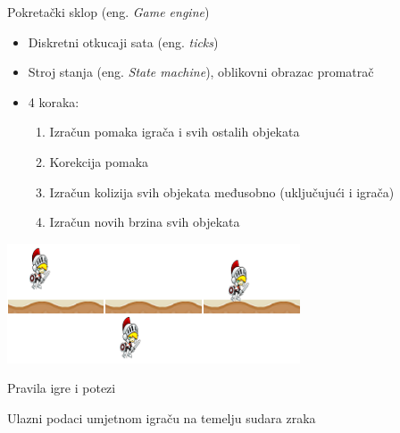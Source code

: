   \begin{frame}{Pokretački sklop (eng. \textit{Game engine})}
  	\begin{itemize}
  		\item Diskretni otkucaji sata (eng. \textit{ticks})
  		\item Stroj stanja (eng. \textit{State machine}), oblikovni obrazac promatrač
  		\item 4 koraka:
  		\begin{enumerate}
  			\item Izračun pomaka igrača i svih ostalih objekata
  			\item Korekcija pomaka
  			\item Izračun kolizija svih objekata međusobno (uključujući i igrača)
  			\item Izračun novih brzina svih objekata 
  		\end{enumerate}
  	\end{itemize}
  	\hspace{5em}\includegraphics[width=0.65\textwidth]{slike/positionCorrection}
  \end{frame}

  \begin{frame}{Pravila igre i potezi}
  \end{frame}

  \begin{frame}{Ulazni podaci umjetnom igraču na temelju sudara zraka}
  \end{frame}
